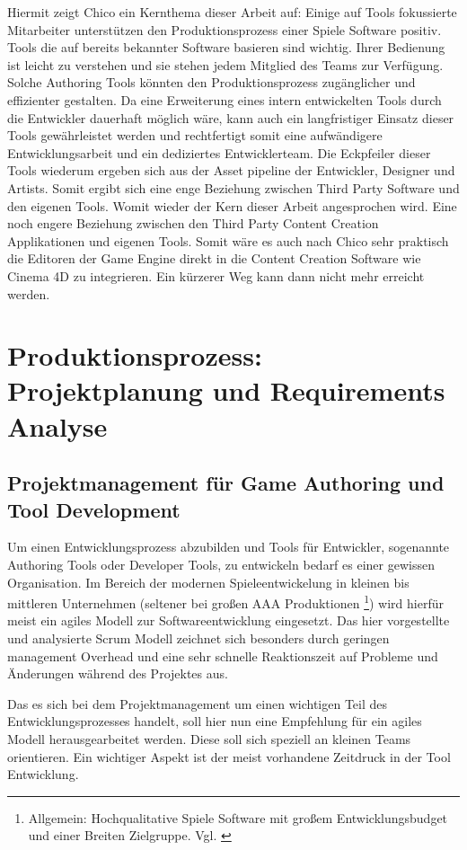 \documentclass[pagesize, paper=a4, fontsize=12pt, titlepage=true, headings=small, headnosepline, abstractoff, liststotoc, nochapterprefix, plainheadsepline, twoside]{scrreprt}
\begin{document}
Hiermit zeigt Chico ein Kernthema dieser Arbeit auf: Einige auf Tools fokussierte Mitarbeiter unterstützen den Produktionsprozess einer Spiele Software positiv. Tools die auf bereits bekannter Software basieren sind wichtig. Ihrer Bedienung ist leicht zu verstehen und sie stehen jedem Mitglied des Teams zur Verfügung. Solche Authoring Tools könnten den Produktionsprozess zugänglicher und effizienter gestalten. Da eine Erweiterung eines intern entwickelten Tools durch die Entwickler dauerhaft möglich wäre, kann auch ein langfristiger Einsatz dieser Tools gewährleistet werden und rechtfertigt somit eine aufwändigere Entwicklungsarbeit und ein dediziertes Entwicklerteam. Die Eckpfeiler dieser Tools wiederum ergeben sich aus der Asset pipeline der Entwickler, Designer und Artists. Somit ergibt sich eine enge Beziehung zwischen Third Party Software und den eigenen Tools. Womit wieder der Kern dieser Arbeit angesprochen wird. Eine noch engere Beziehung zwischen den Third Party Content Creation Applikationen und eigenen Tools. Somit wäre es auch nach Chico sehr praktisch die Editoren der Game Engine direkt in die Content Creation Software wie Cinema 4D zu integrieren. Ein kürzerer Weg kann dann nicht mehr erreicht werden.


\chapter{Produktionsprozess: Projektplanung und Requirements Analyse}
\section{Projektmanagement für Game Authoring und Tool Development}
Um einen Entwicklungsprozess abzubilden und Tools für Entwickler, sogenannte Authoring Tools oder Developer Tools, zu entwickeln bedarf es einer gewissen Organisation. Im Bereich der modernen Spieleentwickelung in kleinen bis mittleren Unternehmen (seltener bei großen AAA Produktionen \footnote{Allgemein: Hochqualitative Spiele Software mit großem Entwicklungsbudget und einer Breiten Zielgruppe. Vgl. \cite{GamasutraAAA2005} }) wird hierfür meist ein agiles Modell zur Softwareentwicklung eingesetzt. Das hier vorgestellte und analysierte Scrum Modell zeichnet sich besonders durch geringen management Overhead und eine sehr schnelle Reaktionszeit auf Probleme und Änderungen während des Projektes aus.

Das es sich bei dem Projektmanagement um einen wichtigen Teil des Entwicklungsprozesses handelt, soll hier nun eine Empfehlung für ein agiles Modell herausgearbeitet werden. Diese soll sich speziell an kleinen Teams orientieren. Ein wichtiger Aspekt ist der meist vorhandene Zeitdruck in der Tool Entwicklung. 
\end{document}
